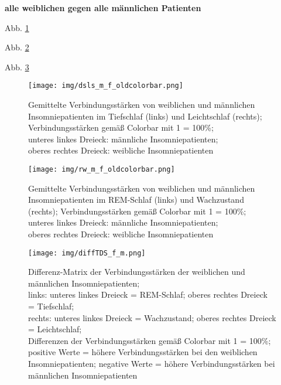 \textbf{alle weiblichen gegen alle männlichen Patienten}

Abb. \ref{fig:dsls_m_f}

Abb. \ref{fig:rw_m_f}

Abb. \ref{fig:diffTDS_f_m}

\begin{figure}[H]
	\centering
	\texttt{[image: img/dsls\_m\_f\_oldcolorbar.png]}
	\caption[Verbindungsstärken von weiblichen und männlichen Insomniepatienten]{Gemittelte Verbindungsstärken von weiblichen und männlichen Insomniepatienten im Tiefschlaf (links) und Leichtschlaf (rechts); Verbindungsstärken gemäß Colorbar mit 1 = 100\%;\\unteres linkes Dreieck: männliche Insomniepatienten;\\oberes rechtes Dreieck: weibliche Insomniepatienten}
	\label{fig:dsls_m_f}
\end{figure}

\begin{figure}[H]
	\centering
	\texttt{[image: img/rw\_m\_f\_oldcolorbar.png]}
	\caption[Verbindungsstärken von weiblichen und männlichen Insomniepatienten]{Gemittelte Verbindungsstärken von weiblichen und männlichen Insomniepatienten im REM-Schlaf (links) und Wachzustand (rechts); Verbindungsstärken gemäß Colorbar mit 1 = 100\%;\\unteres linkes Dreieck: männliche Insomniepatienten;\\oberes rechtes Dreieck: weibliche Insomniepatienten}
	\label{fig:rw_m_f}
\end{figure}

\begin{figure}[H]
	\centering
	\texttt{[image: img/diffTDS\_f\_m.png]}
	\caption[Differenz-Matrix der Verbindungsstärken der weiblichen und männlichen Insomniepatienten]{Differenz-Matrix der Verbindungsstärken der weiblichen und männlichen Insomniepatienten;\\links: unteres linkes Dreieck = REM-Schlaf; oberes rechtes Dreieck = Tiefschlaf;\\rechts: unteres linkes Dreieck = Wachzustand; oberes rechtes Dreieck = Leichtschlaf;\\Differenzen der Verbindungsstärken gemäß Colorbar mit 1 = 100\%;\\positive Werte = höhere Verbindungsstärken bei den weiblichen Insomniepatienten; negative Werte = höhere Verbindungsstärken bei männlichen Insomniepatienten}
	\label{fig:diffTDS_f_m}
\end{figure}




